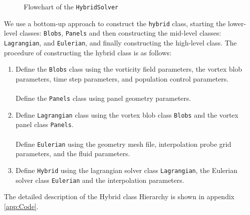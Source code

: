 \begin{figure}[h]
\centering
{}
\caption{Flowchart of the \texttt{HybridSolver}}
\label{fig:tikz_hybridStructure}
\end{figure}

We use a bottom-up approach to construct the \texttt{hybrid} class, starting the lower-level classes: \texttt{Blobs}, \texttt{Panels} and then constructing the mid-level classes: \texttt{Lagrangian}, and \texttt{Eulerian}, and finally constructing the high-level class. The procedure of constructing the hybrid class is as follows:
\begin{enumerate}
\item Define the \texttt{Blobs} class using the vorticity field parameters, the vortex blob parameters, time step parameters, and population control parameters. \\\\
Define the \texttt{Panels} class using panel geometry parameters.
\item Define \texttt{Lagrangian} class using the vortex blob class \texttt{Blobs} and the vortex panel class \texttt{Panels}.\\\\
Define \texttt{Eulerian} using the geometry mesh file, interpolation probe grid parameters, and the fluid parameters.
\item Define \texttt{Hybrid} using the lagrangian solver class \texttt{Lagrangian}, the Eulerian solver class \texttt{Eulerian} and the interpolation parameters.
\end{enumerate}

The detailed description of the Hybrid class Hierarchy is shown in appendix \ref{app:Code}.



